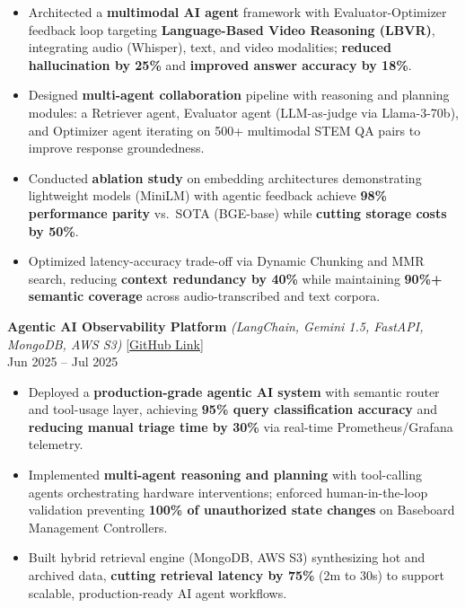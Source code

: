\documentclass[letterpaper,10.5pt]{extarticle}
\begin{document}
\begin{itemize}[leftmargin=12pt, topsep=1pt, itemsep=0pt, parsep=0pt]
    \item Architected a \textbf{multimodal AI agent} framework with Evaluator-Optimizer feedback loop targeting \textbf{Language-Based Video Reasoning (LBVR)}, integrating audio (Whisper), text, and video modalities; \textbf{reduced hallucination by 25\%} and \textbf{improved answer accuracy by 18\%}.
    \item Designed \textbf{multi-agent collaboration} pipeline with reasoning and planning modules: a Retriever agent, Evaluator agent (LLM-as-judge via Llama-3-70b), and Optimizer agent iterating on 500+ multimodal STEM QA pairs to improve response groundedness.
    \item Conducted \textbf{ablation study} on embedding architectures demonstrating lightweight models (MiniLM) with agentic feedback achieve \textbf{98\% performance parity} vs.\ SOTA (BGE-base) while \textbf{cutting storage costs by 50\%}.
    \item Optimized latency-accuracy trade-off via Dynamic Chunking and MMR search, reducing \textbf{context redundancy by 40\%} while maintaining \textbf{90\%+ semantic coverage} across audio-transcribed and text corpora.
\end{itemize}

\vspace{3pt}

\noindent\textbf{Agentic AI Observability Platform}
\textit{(LangChain, Gemini 1.5, FastAPI, MongoDB, AWS S3)} \hfill \href{https://github.com/slowloris-98/Agentic-Oberservability-BMC}{[GitHub Link]} \\
Jun 2025 -- Jul 2025

\begin{itemize}[leftmargin=12pt, topsep=1pt, itemsep=0pt, parsep=0pt]
    \item Deployed a \textbf{production-grade agentic AI system} with semantic router and tool-usage layer, achieving \textbf{95\% query classification accuracy} and \textbf{reducing manual triage time by 30\%} via real-time Prometheus/Grafana telemetry.
    \item Implemented \textbf{multi-agent reasoning and planning} with tool-calling agents orchestrating hardware interventions; enforced human-in-the-loop validation preventing \textbf{100\% of unauthorized state changes} on Baseboard Management Controllers.
    \item Built hybrid retrieval engine (MongoDB, AWS S3) synthesizing hot and archived data, \textbf{cutting retrieval latency by 75\%} (2m to 30s) to support scalable, production-ready AI agent workflows.
\end{itemize}
\end{document}
